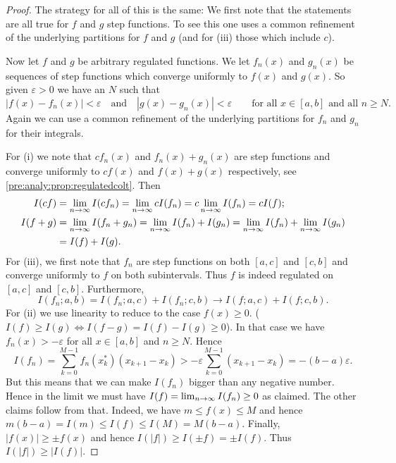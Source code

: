 \documentclass[10pt, a4paper]{article}
\begin{document}
\begin{proof}
    The strategy for all of this is the same:
    We first note that the statements are all true for $f$ and $g$ step functions.
    To see this one uses a common refinement of the underlying partitions for $f$ and $g$
    (and for (iii) those which include $c$).

    Now let $f$ and $g$ be arbitrary regulated functions.
    We let $f_n(x)$ and $g_n(x)$ be sequences of step functions which converge uniformly to $f(x)$ and $g(x)$.
    So given $\varepsilon > 0$ we have an $N$ such that
    \[
    |f(x) - f_n(x)| < \varepsilon\quad\text{and}\quad|g(x) - g_n(x)| < \varepsilon\qquad\text{for all } x \in [a, b]\text{ and all } n \geq N.
    \]
    Again we can use a common refinement of the underlying partitions for $f_n$ and $g_n$ for their integrals.

    For (i) we note that $cf_n(x)$ and $f_n(x) + g_n(x)$ are step functions and converge uniformly to $cf(x)$ and $f(x) + g(x)$ respectively,
    see \autoref{pre:analy:prop:regulatedcolt}.
    Then
    \begin{align*}
        I(cf) &= \lim_{n \rightarrow \infty} I(cf_n) = \lim_{n \rightarrow \infty} cI(f_n) = c\lim_{n \rightarrow \infty} I(f_n) = cI(f); \\
        I(f + g) &= \lim_{n \rightarrow \infty} I(f_n + g_n) = \lim_{n \rightarrow \infty} I(f_n) + I(g_n) = \lim_{n \rightarrow \infty} I(f_n) + \lim_{n \rightarrow \infty} I(g_n) \\
        &= I(f) + I(g).
    \end{align*}
    For (iii),
    we first note that $f_n$ are step functions on both $[a, c]$ and $[c, b]$ and converge uniformly to $f$ on both subintervals.
    Thus $f$ is indeed regulated on $[a, c]$ and $[c, b]$.
    Furthermore,
    \[
    I(f_n; a, b) = I(f_n; a, c) + I(f_n; c, b) \rightarrow I(f; a, c) + I(f; c, b).
    \]
    For (ii) we use linearity to reduce to the case $f(x) \geq 0$.
    ($I(f) \geq I(g) \iff I(f - g) = I(f) - I(g) \geq 0$).
    In that case we have $f_n(x) > -\varepsilon$ for all $x \in [a, b]$ and $n \geq N$.
    Hence
    \[
    I(f_n) = \sum_{k = 0}^{M - 1}f_n(x_k ^ {*})(x_{k + 1} - x_k) > -\varepsilon\sum_{k = 0}^{M - 1}(x_{k + 1} - x_k) = -(b - a)\varepsilon.
    \]
    But this means that we can make $I(f_n)$ bigger than any negative number.
    Hence in the limit we must have $I(f) = \lim_{n \rightarrow \infty} I(f_n) \geq 0$ as claimed.
    The other claims follow from that.
    Indeed,
    we have $m \leq f(x) \leq M$ and hence $m(b - a) = I(m) \leq I(f) \leq I(M) = M(b - a)$.
    Finally,
    $|f(x)| \geq \pm f(x)$ and hence $I(|f|) \geq I(\pm f) = \pm I(f)$.
    Thus $I(|f|) \geq |I(f)|$.
\end{proof}
\end{document}
